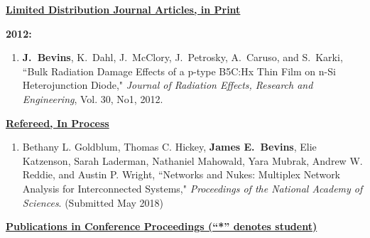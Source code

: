 
\underline{\textbf{Limited Distribution Journal Articles, in Print }}

\textbf{2012:}
\begin{enumerate}
  \item \textbf{J.\ Bevins}, K.\ Dahl, J.\ McClory, J.\ Petrosky, A.\ Caruso, and S.\ Karki, ``Bulk Radiation Damage Effects of a p-type B5C:Hx Thin Film on n-Si Heterojunction Diode," \textit{Journal of Radiation Effects, Research and Engineering}, Vol. 30, No1, 2012.
\end{enumerate}


\underline{\textbf{Refereed, In Process}}

\begin{enumerate}
  
  \item Bethany L. Goldblum, Thomas C. Hickey, \textbf{James E.\ Bevins}, Elie Katzenson, Sarah Laderman, Nathaniel Mahowald, Yara Mubrak, Andrew W. Reddie, and Austin P. Wright, ``Networks and Nukes: Multiplex Network Analysis for Interconnected Systems," \textit{Proceedings of the National Academy of Sciences}. (Submitted May 2018)
  
\end{enumerate}


\underline{\textbf{Publications in Conference Proceedings (“*” denotes student)}}

